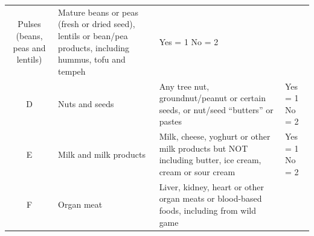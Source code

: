 \documentclass[12pt,]{book}
\theoremstyle{definition}
\theoremstyle{definition}
\theoremstyle{definition}
\theoremstyle{remark}
\begin{document}
\begin{longtable}[]{@{}clll@{}}
\begin{minipage}[t]{0.18\columnwidth}
Pulses (beans, peas and lentils)\strut
\end{minipage} & \begin{minipage}[t]{0.54\columnwidth}\raggedright
Mature beans or peas (fresh or dried seed), lentils or bean/pea
products, including hummus, tofu and tempeh\strut
\end{minipage} & \begin{minipage}[t]{0.12\columnwidth}\raggedright
Yes = 1 No = 2\strut
\end{minipage}\tabularnewline
\begin{minipage}[t]{0.05\columnwidth}\centering
D\strut
\end{minipage} & \begin{minipage}[t]{0.18\columnwidth}\raggedright
Nuts and seeds\strut
\end{minipage} & \begin{minipage}[t]{0.54\columnwidth}\raggedright
Any tree nut, groundnut/peanut or certain seeds, or nut/seed ``butters''
or pastes\strut
\end{minipage} & \begin{minipage}[t]{0.12\columnwidth}\raggedright
Yes = 1 No = 2\strut
\end{minipage}\tabularnewline
\begin{minipage}[t]{0.05\columnwidth}\centering
E\strut
\end{minipage} & \begin{minipage}[t]{0.18\columnwidth}\raggedright
Milk and milk products\strut
\end{minipage} & \begin{minipage}[t]{0.54\columnwidth}\raggedright
Milk, cheese, yoghurt or other milk products but NOT including butter,
ice cream, cream or sour cream\strut
\end{minipage} & \begin{minipage}[t]{0.12\columnwidth}\raggedright
Yes = 1 No = 2\strut
\end{minipage}\tabularnewline
\begin{minipage}[t]{0.05\columnwidth}\centering
F\strut
\end{minipage} & \begin{minipage}[t]{0.18\columnwidth}\raggedright
Organ meat\strut
\end{minipage} & \begin{minipage}[t]{0.54\columnwidth}\raggedright
Liver, kidney, heart or other organ meats or blood-based foods,
including from wild game\strut
\end{minipage} & \begin{minipage}[t]{0.12\columnwidth}\raggedright

\end{minipage}
\end{longtable}
\end{document}
